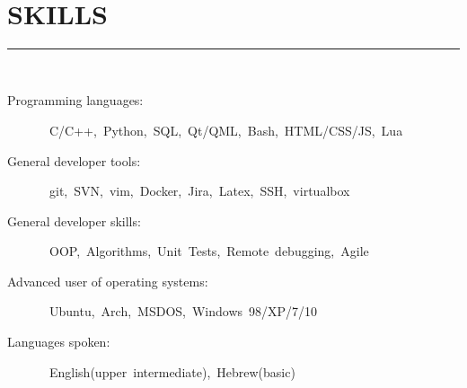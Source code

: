 \documentclass[a4paper,oneside,12pt]{article}
\newcommand{\cvpart}[1]{%
\vspace{-1em}%
\section*{\large\bfseries\MakeTextUppercase{#1}}%
\vspace{-1em}%
\rule{\linewidth}{0.3em}\\[-.3em]%
}
\begin{document}
~\\

\cvpart{Skills}
\begin{description}
\item[Programming languages:]~C/C++,~Python,~SQL,~Qt/QML,~Bash,~HTML/CSS/JS,~Lua
\item[General developer tools:]~git,~SVN,~vim,~Docker,~Jira,~Latex,~SSH,~virtualbox
\item[General developer skills:]~OOP,~Algorithms,~Unit~Tests,~Remote~debugging,~Agile
\item[Advanced user of operating systems:]~Ubuntu,~Arch,~MSDOS,~Windows~98/XP/7/10
\item[Languages spoken:]~English(upper~intermediate),~Hebrew(basic)

\end{description}
\end{document}
